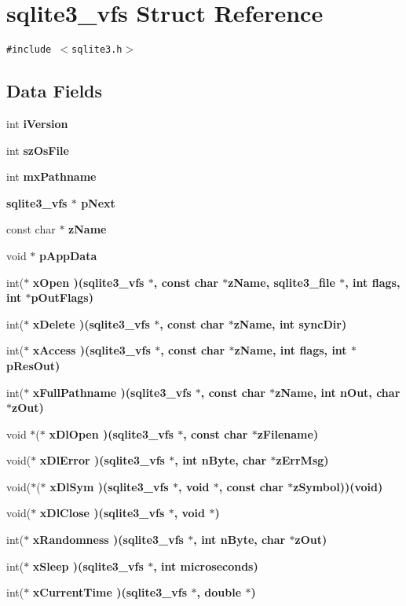 \section{sqlite3\_\-vfs Struct Reference}
\label{structsqlite3__vfs}
{\tt \#include $<$sqlite3.h$>$}

\subsection*{Data Fields}
\begin{CompactItemize}
\item 
int \bf{i\-Version}
\item 
int \bf{sz\-Os\-File}
\item 
int \bf{mx\-Pathname}
\item 
\bf{sqlite3\_\-vfs} $\ast$ \bf{p\-Next}
\item 
const char $\ast$ \bf{z\-Name}
\item 
void $\ast$ \bf{p\-App\-Data}
\item 
int($\ast$ \bf{x\-Open} )(\bf{sqlite3\_\-vfs} $\ast$, const char $\ast$\bf{z\-Name}, \bf{sqlite3\_\-file} $\ast$, int flags, int $\ast$p\-Out\-Flags)
\item 
int($\ast$ \bf{x\-Delete} )(\bf{sqlite3\_\-vfs} $\ast$, const char $\ast$\bf{z\-Name}, int sync\-Dir)
\item 
int($\ast$ \bf{x\-Access} )(\bf{sqlite3\_\-vfs} $\ast$, const char $\ast$\bf{z\-Name}, int flags, int $\ast$p\-Res\-Out)
\item 
int($\ast$ \bf{x\-Full\-Pathname} )(\bf{sqlite3\_\-vfs} $\ast$, const char $\ast$\bf{z\-Name}, int n\-Out, char $\ast$z\-Out)
\item 
void $\ast$($\ast$ \bf{x\-Dl\-Open} )(\bf{sqlite3\_\-vfs} $\ast$, const char $\ast$z\-Filename)
\item 
void($\ast$ \bf{x\-Dl\-Error} )(\bf{sqlite3\_\-vfs} $\ast$, int n\-Byte, char $\ast$z\-Err\-Msg)
\item 
void($\ast$($\ast$ \bf{x\-Dl\-Sym} )(\bf{sqlite3\_\-vfs} $\ast$, void $\ast$, const char $\ast$z\-Symbol))(void)
\item 
void($\ast$ \bf{x\-Dl\-Close} )(\bf{sqlite3\_\-vfs} $\ast$, void $\ast$)
\item 
int($\ast$ \bf{x\-Randomness} )(\bf{sqlite3\_\-vfs} $\ast$, int n\-Byte, char $\ast$z\-Out)
\item 
int($\ast$ \bf{x\-Sleep} )(\bf{sqlite3\_\-vfs} $\ast$, int microseconds)
\item 
int($\ast$ \bf{x\-Current\-Time} )(\bf{sqlite3\_\-vfs} $\ast$, double $\ast$)

\end{CompactItemize}
